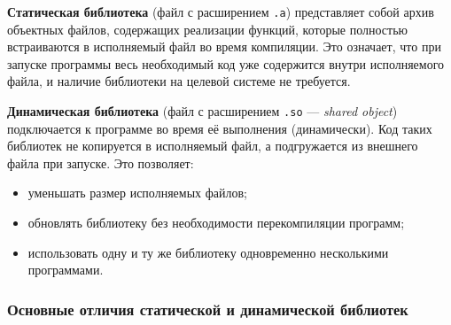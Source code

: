 \textbf{Статическая библиотека} (файл с расширением \texttt{.a}) представляет собой архив объектных файлов, содержащих реализации функций, которые полностью встраиваются в исполняемый файл во время компиляции. Это означает, что при запуске программы весь необходимый код уже содержится внутри исполняемого файла, и наличие библиотеки на целевой системе не требуется.

\textbf{Динамическая библиотека} (файл с расширением \texttt{.so} — \textit{shared object}) подключается к программе во время её выполнения (динамически). Код таких библиотек не копируется в исполняемый файл, а подгружается из внешнего файла при запуске. Это позволяет:
\begin{itemize}[noitemsep]
  \item уменьшать размер исполняемых файлов;
  \item обновлять библиотеку без необходимости перекомпиляции программ;
  \item использовать одну и ту же библиотеку одновременно несколькими программами.
\end{itemize}

\subsubsection*{Основные отличия статической и динамической библиотек}

